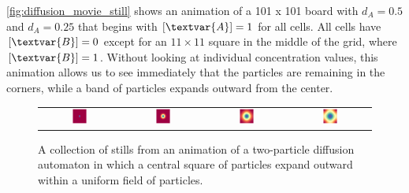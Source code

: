 \autoref{fig:diffusion_movie_still} shows an animation of a 101 x 101 board with $d_A = 0.5$ and $d_A = 0.25$ that begins with $[\textvar{A}] = 1$ for all cells. All cells have $[\textvar{B}] = 0$ except for an $11 \times 11$ square in the middle of the grid, where $[\textvar{B}] = 1$. Without looking at individual concentration values, this animation allows us to see immediately that the  particles are remaining in the corners, while a band of  particles expands outward from the center.\\

\begin{figure}[h]
\centering
\mySfFamily
\begin{tabular}{c c c c}
\includegraphics[width = 0.2\textwidth]{../images/diffusion__Moment_1.png} & \includegraphics[width = 0.2\textwidth]{../images/diffusion__Moment_2.png} &
\includegraphics[width = 0.2\textwidth]{../images/diffusion__Moment_3.png} & \includegraphics[width = 0.2\textwidth]{../images/diffusion__Moment_4.png}
\end{tabular}
\caption{A collection of stills from an animation of a two-particle diffusion automaton in which a central square of  particles expand outward within a uniform field of  particles.}
\label{fig:diffusion_movie_still}
\end{figure}

